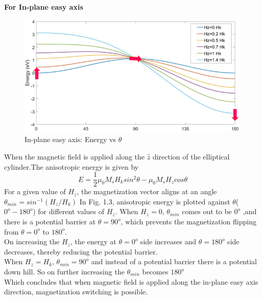 \documentclass[12pt,a4paper,bold]{thesis}
\theoremstyle{thm}
\theoremstyle{definition}
\begin{document}
\textbf{For In-plane easy axis}\\
\begin{figure}[H]
	\centering
   \includegraphics[scale=0.56]{Images/21.png} 
   \caption{In-plane easy axis: Energy vs $\theta$}
\end{figure}
When the magnetic field is applied along the $\hat{z}$ direction of the elliptical cylinder.The anisotropic energy is given by 
\[E=\frac{1}{2}\mu_0M_sH_ksin^2\theta - \mu_0M_sH_zcos\theta\]
For a given value of $H_z$, the magnetization vector aligns at an angle $\theta_{min}=sin^{-1}(H_z/H_k)$
In Fig. 1.3, anisotropic energy is plotted against $\theta$($0^o - 180^o$) for different values of $H_z$.
When $H_z=0$, $\theta_{min}$ comes out to be $0^o$ ,and there is a potential barrier at $\theta=90^o$, which prevents the magnetization flipping from $\theta=0^o$ to $180^o$. \\
On increasing the $H_z$, the energy at $\theta=0^o$ side increases and $\theta=180^o$ side decreases, thereby reducing the potential barrier.\\
When $H_z=H_k$, $\theta_{min}=90^o$ and instead of a potential barrier there is a potential down hill. So on further increasing the $\theta_{min}$ becomes $180^o$\\
Which concludes that when magnetic field is applied along the in-plane easy axis direction, magnetization switching is possible.  
\end{document}
